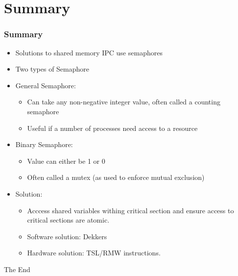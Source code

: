 \documentclass{beamer}
\begin{document}
\section{Summary}
\begin{frame}
\frametitle{Summary}
\begin{itemize}
\item Solutions to shared memory IPC use semaphores
\item Two types of Semaphore
\item General Semaphore:
\begin{itemize}
\item Can take any non-negative integer value, often called a counting semaphore
\item Useful if a number of processes need access to a resource
\end{itemize}
\item Binary Semaphore:
\begin{itemize}
\item Value can either be 1 or 0
\item Often called a mutex (as used to enforce mutual exclusion)
\end{itemize}
\item Solution:
\begin{itemize}
\item Acccess shared variables withing critical section and ensure access to critical sections are atomic.
\item Software solution: Dekkers
\item Hardware solution: TSL/RMW instructions.
\end{itemize}
\end{itemize}
\end{frame}

\begin{frame} 
\Huge{\centerline{The End}}
\end{frame}
\end{document}
